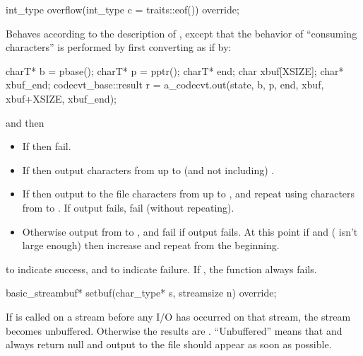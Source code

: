 %
\begin{itemdecl}
int_type overflow(int_type c = traits::eof()) override;
\end{itemdecl}

\begin{itemdescr}
\pnum
\effects
Behaves according to the description of
,
except that the behavior of ``consuming characters'' is performed by first
converting as if by:
\begin{codeblock}
charT* b = pbase();
charT* p = pptr();
charT* end;
char   xbuf[XSIZE];
char*  xbuf_end;
codecvt_base::result r =
  a_codecvt.out(state, b, p, end, xbuf, xbuf+XSIZE, xbuf_end);
\end{codeblock}
and then
\begin{itemize}
\item If  then fail.
\item If  then output characters from
 up to (and not including) .
\item If  then output to the file characters from
 up to , and repeat using characters from
 to . If output fails, fail (without repeating).
\item Otherwise output from  to , and fail if output fails.
At this point if  and  ( isn't large
enough) then increase  and repeat from the beginning.
\end{itemize}

\pnum
\returns
{}
to indicate success, and
to indicate failure.
If
,
the function always fails.
\end{itemdescr}

%
\begin{itemdecl}
basic_streambuf* setbuf(char_type* s, streamsize n) override;
\end{itemdecl}

\begin{itemdescr}
\pnum
\effects
If
is called on a stream before any I/O has occurred on that stream, the
stream becomes unbuffered.
Otherwise the results are .
``Unbuffered'' means that
and
always return null
and output to the file should appear as soon as possible.
\end{itemdescr}

